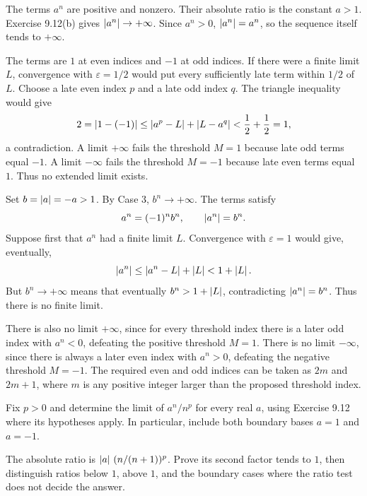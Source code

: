 The terms $a^n$ are positive and nonzero. Their absolute ratio
is the constant $a>1$. Exercise 9.12(b) gives
$\left|a^n\right|\to+\infty$. Since $a^n>0$,
$\left|a^n\right|=a^n$, so the sequence itself tends to $+\infty$.

The terms are $1$ at even indices and $-1$ at odd indices.
If there were a finite limit $L$, convergence with
$\varepsilon=1/2$ would put every sufficiently late term
within $1/2$ of $L$. Choose a late even index $p$ and a late
odd index $q$. The triangle inequality would give
\[
 2=\left|1-(-1)\right|
 \leq\left|a^p-L\right|+\left|L-a^q\right|<\frac12+\frac12=1,
\]
a contradiction. A limit $+\infty$ fails the threshold $M=1$
because late odd terms equal $-1$. A limit $-\infty$ fails
the threshold $M=-1$ because late even terms equal $1$.
Thus no extended limit exists.

Set $b=\left|a\right|=-a>1$. By Case 3, $b^n\to+\infty$.
The terms satisfy
\[
 a^n=(-1)^n b^n,\qquad\left|a^n\right|=b^n.
\]
Suppose first that $a^n$ had a finite limit $L$.
Convergence with $\varepsilon=1$ would give, eventually,
\[
 \left|a^n\right|\leq\left|a^n-L\right|+\left|L\right|<1+\left|L\right|.
\]
But $b^n\to+\infty$ means that eventually
$b^n>1+\left|L\right|$, contradicting $\left|a^n\right|=b^n$.
Thus there is no finite limit.

There is also no limit $+\infty$, since for every threshold
index there is a later odd index with $a^n<0$, defeating
the positive threshold $M=1$. There is no limit $-\infty$,
since there is always a later even index with $a^n>0$,
defeating the negative threshold $M=-1$.
The required even and odd indices can be taken as $2m$ and
$2m+1$, where $m$ is any positive integer larger than the
proposed threshold index.



\goal Fix $p>0$ and determine the limit of $a^n/n^p$
for every real $a$, using Exercise 9.12 where its hypotheses
apply. In particular, include both boundary bases $a=1$ and
$a=-1$.

\idea The absolute ratio is
$\left|a\right|\,(n/(n+1))^p$. Prove its second factor tends to $1$,
then distinguish ratios below $1$, above $1$, and the boundary
cases where the ratio test does not decide the answer.

